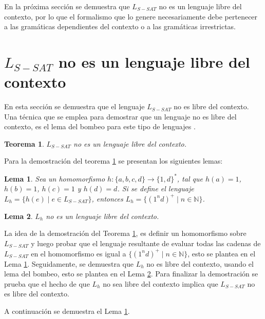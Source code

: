 \documentclass[12pt]{article}
\newtheorem{theorem}{Teorema}
\newtheorem{lemma}{Lema}
\begin{document}
En la próxima sección se demuestra que $L_{S-SAT}$ no es un lenguaje libre del contexto, por lo que el formalismo que lo genere necesariamente debe pertenecer a las gramáticas dependientes del contexto o a las gramáticas irrestrictas.

\section{$L_{S-SAT}$ no es un lenguaje libre del contexto}
\label{sec:LSATCFL}

En esta sección se demuestra que el lenguaje $L_{S-SAT}$ no es libre del contexto. Una técnica que se emplea para demostrar que un lenguaje no es libre del contexto, es el lema del bombeo para este tipo de lenguajes \cite{authomataTheory}.

\begin{theorem}
    \label{teo:LSATCFL}
    $L_{S-SAT}$ no es un lenguaje libre del contexto.
\end{theorem}

Para la demostración del teorema \ref{teo:LSATCFL} se presentan los siguientes lemas:

\begin{lemma}
    \label{lem:Lh}
    Sea un homomorfismo $h: \{a,b,c,d\}\to \{1,d\}^*$, tal 
    que $h(a)=1$, $h(b)=1$, $h(c)=1$ y $h(d)=d$. Si se define el lenguaje $L_h=\{h(e)\mid e\in L_{S-SAT}\}$,
    entonces $L_h=\{(1^nd)^+\mid n\in \mathbb{N}\}$.
\end{lemma}

\begin{lemma}
    \label{lem:LhCFL}
    $L_h$ no es un lenguaje libre del contexto.
\end{lemma}

La idea de la demostración del Teorema \ref{teo:LSATCFL}, es definir un homomorfismo sobre 
$L_{S-SAT}$ y luego probar que el lenguaje resultante de evaluar todas las cadenas de $L_{S-SAT}$ en el homomorfismo es igual a $\{(1^nd)^+\mid n\in \mathbb{N}\}$, esto se plantea
en el Lema \ref{lem:Lh}. Seguidamente, se demuestra que $L_h$ no es libre del contexto, usando el lema del bombeo,
esto se plantea en el Lema \ref{lem:LhCFL}. Para finalizar la demostración se prueba que el hecho de que $L_h$ no sea
libre del contexto implica que $L_{S-SAT}$ no es libre del contexto.

A continuación se demuestra el Lema \ref{lem:Lh}.
\end{document}
